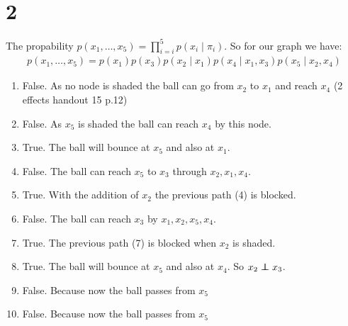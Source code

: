 \section*{2}
The propability $p(x_1,\dotsc,x_5) = \prod_{i=i}^5 p(x_i\mid \pi_i)$.
So for our graph we have:
\begin{align*}
p(x_1,\dotsc,x_5) = p(x_1)p(x_3)p(x_2\mid x_1)p(x_4\mid x_{1},x_3)p(x_5\mid x_{2},x_4)
\end{align*}
\begin{enumerate}
\item False. As no node is shaded the ball can go from $x_2$ to $x_1$ and reach $x_4$ (2 effects handout 15 p.12)
\item False. As $x_5$ is shaded the ball can reach $x_4$ by this node.
\item True. The ball will bounce at $x_5$ and also at $x_1$.
\item False. The ball can reach $x_5$ to $x_3$ through $x_2, x_1, x_4$.
\item True. With the addition of $x_2$ the previous path (4) is blocked.
\item False. The ball can reach $x_3$ by $x_1, x_2, x_5, x_4$.
\item True. The previous path (7) is blocked when $x_2$ is shaded.
\item True. The ball will bounce at $x_5$ and also at $x_4$. So $x_2 \independent x_3$. 
\item False. Because now the ball passes from $x_5$
\item False. Because now the ball passes from $x_5$
\end{enumerate}

